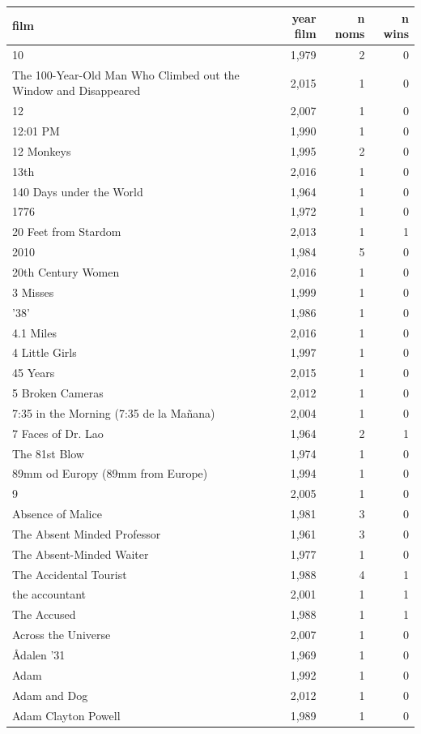\begin{tabular}{lrrr}
\toprule
film & year film & n noms & n wins \\
\midrule
10 & 1,979 & 2 & 0 \\
The 100-Year-Old Man Who Climbed out the Window and Disappeared & 2,015 & 1 & 0 \\
12 & 2,007 & 1 & 0 \\
12:01 PM & 1,990 & 1 & 0 \\
12 Monkeys & 1,995 & 2 & 0 \\
13th & 2,016 & 1 & 0 \\
140 Days under the World & 1,964 & 1 & 0 \\
1776 & 1,972 & 1 & 0 \\
20 Feet from Stardom & 2,013 & 1 & 1 \\
2010 & 1,984 & 5 & 0 \\
20th Century Women & 2,016 & 1 & 0 \\
3 Misses & 1,999 & 1 & 0 \\
'38' & 1,986 & 1 & 0 \\
4.1 Miles & 2,016 & 1 & 0 \\
4 Little Girls & 1,997 & 1 & 0 \\
45 Years & 2,015 & 1 & 0 \\
5 Broken Cameras & 2,012 & 1 & 0 \\
7:35 in the Morning (7:35 de la Mañana) & 2,004 & 1 & 0 \\
7 Faces of Dr. Lao & 1,964 & 2 & 1 \\
The 81st Blow & 1,974 & 1 & 0 \\
89mm od Europy (89mm from Europe) & 1,994 & 1 & 0 \\
9 & 2,005 & 1 & 0 \\
Absence of Malice & 1,981 & 3 & 0 \\
The Absent Minded Professor & 1,961 & 3 & 0 \\
The Absent-Minded Waiter & 1,977 & 1 & 0 \\
The Accidental Tourist & 1,988 & 4 & 1 \\
the accountant & 2,001 & 1 & 1 \\
The Accused & 1,988 & 1 & 1 \\
Across the Universe & 2,007 & 1 & 0 \\
Ådalen '31 & 1,969 & 1 & 0 \\
Adam & 1,992 & 1 & 0 \\
Adam and Dog & 2,012 & 1 & 0 \\
Adam Clayton Powell & 1,989 & 1 & 0 \\

\end{tabular}
